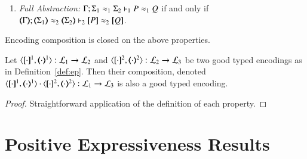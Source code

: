 \begin{definition}
\begin{enumerate}[1.]
		\item \emph{Full Abstraction:} %
		$\Gamma; \Sigma_1 \approx_1 \Sigma_2 \vdash_1 P \approx_1 Q $ if and only if $\mapt{\Gamma}; \mapt{\Sigma_1} \wb_2 \mapt{\Sigma_2} \proves_2 \map{P} \wb_2 \map{Q} $.
	\end{enumerate}
\end{definition}

Encoding composition is closed on the above properties.

\begin{proposition}
	Let $\encod{\cdot}{\cdot}{1}: \tyl{L}_1 \to \tyl{L}_2$ and $\encod{\cdot}{\cdot}{2}: \tyl{L}_2 \to \tyl{L}_3$
	be two good typed encodings as in Definition~\ref{def:ep}.
	Then their composition, denoted 
	$\encod{\cdot}{\cdot}{1} \cdot \encod{\cdot}{\cdot}{2}: \tyl{L}_1 \to \tyl{L}_3$
	is also a good typed encoding.
\end{proposition}

\begin{proof}
	Straightforward application of the definition of each property.
\end{proof}

\section{Positive Expressiveness Results}

